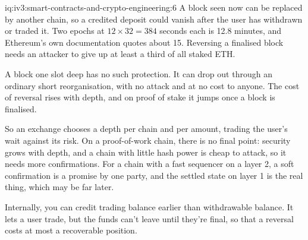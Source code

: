 \begin{solution}{iq:iv3:smart-contracts-and-crypto-engineering:6}
A block seen now can be replaced by another chain, so a credited deposit could vanish after the user has withdrawn or traded it. Two epochs at $12 \times 32 = 384$ seconds each is 12.8 minutes, and Ethereum's own documentation quotes about 15. Reversing a finalised block needs an attacker to give up at least a third of all staked ETH.

A block one slot deep has no such protection. It can drop out through an ordinary short reorganisation, with no attack and at no cost to anyone. The cost of reversal rises with depth, and on proof of stake it jumps once a block is finalised.

So an exchange chooses a depth per chain and per amount, trading the user's wait against its risk. On a proof-of-work chain, there is no final point: security grows with depth, and a chain with little hash power is cheap to attack, so it needs more confirmations. For a chain with a fast sequencer on a layer 2, a soft confirmation is a promise by one party, and the settled state on layer 1 is the real thing, which may be far later.

Internally, you can credit trading balance earlier than withdrawable balance. It lets a user trade, but the funds can't leave until they're final, so that a reversal costs at most a recoverable position.

\end{solution}

